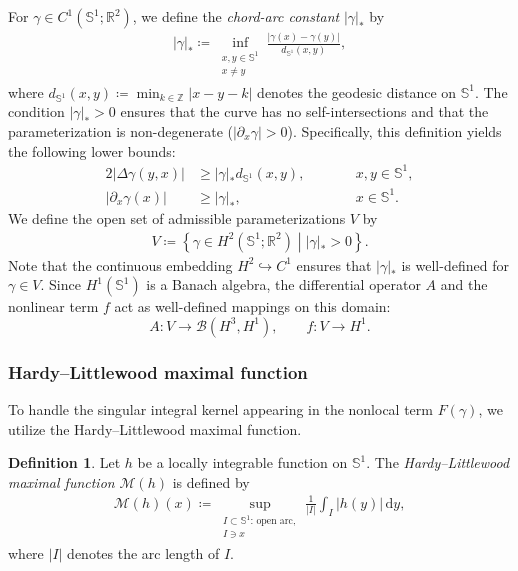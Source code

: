 \documentclass{article}
\theoremstyle{remark}
\theoremstyle{definition}
\newtheorem{definition}[theorem]{Definition}
\newcommand{\relmiddle}[1]{\mathrel{}\middle#1\mathrel{}}
\numberwithin{equation}{section}
\begin{document}
For $\gamma \in C^1(\mathbb{S}^1; \mathbb{R}^2)$, we define the \textit{chord-arc constant} $|\gamma|_\ast$ by
\begin{align*}
    |\gamma|_\ast \coloneqq \inf_{\substack{x,y\in \mathbb{S}^1\\x\neq y}} \frac{|\gamma(x)-\gamma(y)|}{d_{\mathbb{S}^1}(x,y)},
\end{align*}
where $d_{\mathbb{S}^1}(x,y) \coloneqq \min_{k\in\mathbb{Z}}|x-y-k|$ denotes the geodesic distance on $\mathbb{S}^1$.
The condition $|\gamma|_\ast > 0$ ensures that the curve has no self-intersections and that the parameterization is non-degenerate ($|\partial_x \gamma| > 0$).
Specifically, this definition yields the following lower bounds:
\begin{alignat}{2}
    |\Delta\gamma(y,x)| &\ge |\gamma|_\ast d_{\mathbb{S}^1}(x,y), &\qquad& x,y\in\mathbb{S}^1, \label{eq:diff_LB}\\
    |\partial_x \gamma(x)| &\ge |\gamma|_\ast, &\qquad& x\in\mathbb{S}^1. \label{eq:gamma'_LB}
\end{alignat}
We define the open set of admissible parameterizations $V$ by
\begin{align*}
    V \coloneqq \left\{ \gamma\in H^2(\mathbb{S}^1; \mathbb{R}^2) \relmiddle{|} |\gamma|_\ast > 0 \right\}.
\end{align*}
Note that the continuous embedding $H^2 \hookrightarrow C^1$ ensures that $|\gamma|_\ast$ is well-defined for $\gamma \in V$.
Since $H^1(\mathbb{S}^1)$ is a Banach algebra, the differential operator $A$ and the nonlinear term $f$ act as well-defined mappings on this domain:
\[
    A \colon V \to \mathcal{B}(H^3, H^1), \qquad f \colon V \to H^1.
\]

\subsubsection{Hardy--Littlewood maximal function}

To handle the singular integral kernel appearing in the nonlocal term $F(\gamma)$, we utilize the Hardy--Littlewood maximal function.

\begin{definition}
    \label{def:HL}
    Let $h$ be a locally integrable function on $\mathbb{S}^1$. The \textit{Hardy--Littlewood maximal function} $\mathcal{M}(h)$ is defined by
    \begin{align*}
        \mathcal{M}(h)(x) \coloneqq \sup_{\substack{I \subset \mathbb{S}^1 \text{: open arc},\\ I \ni x}} \frac{1}{|I|} \int_I |h(y)| \, \mathrm{d}y,
    \end{align*}
    where $|I|$ denotes the arc length of $I$.
\end{definition}
\end{document}
